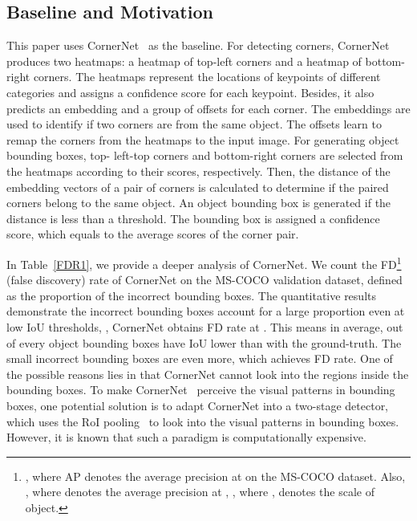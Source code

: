 \documentclass[10pt,twocolumn,letterpaper]{article}
\begin{document}
\subsection{Baseline and Motivation}\label{baseline}
This paper uses CornerNet~\cite{law2018cornernet} as the baseline. For detecting corners, CornerNet produces two heatmaps: a heatmap of top-left corners and a heatmap of bottom-right corners. The heatmaps represent the locations of keypoints of different categories and assigns a confidence score for each keypoint. Besides, it also predicts an embedding and a group of offsets for each corner. The embeddings are used to identify if two corners are from the same object. The offsets learn to remap the corners from the heatmaps to the input image. For generating object bounding boxes, top- left-top corners and bottom-right corners are selected from the heatmaps according to their scores, respectively. Then, the distance of the embedding vectors of a pair of corners is calculated to determine if the paired corners belong to the same object. An object bounding box is generated if the distance is less than a threshold. The bounding box is assigned a confidence score, which equals to the average scores of the corner pair. 
\begin{table}[tb]
\centering
{}
\vspace{-2ex}
\caption{False discovery rates () of CornerNet. The false discovery rate reflects the distribution of incorrect bounding boxes. The results suggest the incorrect bounding boxes account for a large proportion.}
\label{FDR1}
\end{table}

In Table~\ref{FDR1}, we provide a deeper analysis of CornerNet. We count the FD\footnote{, where AP denotes the average precision at  on the MS-COCO dataset. Also, , where  denotes the average precision at , , where , denotes the scale of object.} (false discovery) rate of CornerNet on the MS-COCO validation dataset, defined as the proportion of the incorrect bounding boxes. The quantitative results demonstrate the incorrect bounding boxes account for a large proportion even at low IoU thresholds, \eg, CornerNet obtains  FD rate at . This means in average,   out of every  object bounding boxes have IoU lower than  with the ground-truth. The small incorrect bounding boxes are even more, which achieves  FD rate. One of the possible reasons lies in that CornerNet cannot look into the regions inside the bounding boxes. To make CornerNet~\cite{law2018cornernet} perceive the visual patterns in bounding boxes, one potential solution is to adapt CornerNet into a two-stage detector, which uses the RoI pooling~\cite{girshick2015fast} to look into the visual patterns in bounding boxes. However, it is known that such a paradigm is computationally expensive.
\end{document}
